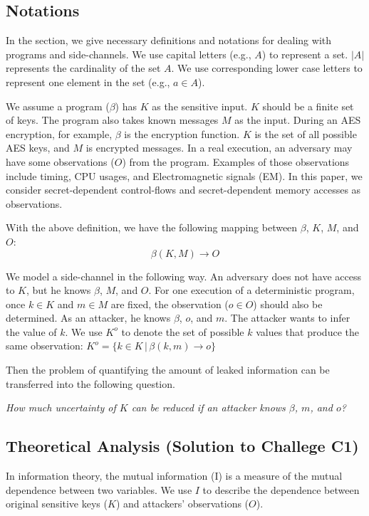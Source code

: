 \subsection{Notations}
In the section, we give necessary definitions and notations for dealing with
programs and side-channels. We use capital letters (e.g., $A$) to represent a
set. $|A|$ represents the cardinality of the set $A$. We use corresponding lower case
letters to represent one element in the set (e.g., $a \in A$).

We assume a program ($\beta$) has $K$ as the sensitive input. $K$ should be 
a finite set of keys. The program also takes known messages $M$ as the input. 
During an AES encryption, for example, 
$\beta$ is the encryption function. $K$ is the set of all possible AES keys, 
and $ M $ is encrypted messages. In a real execution, an adversary may have 
some observations ($O$) from the program. Examples of those observations include 
timing, CPU usages, and Electromagnetic signals (EM). In this paper, 
we consider secret-dependent control-flows and secret-dependent memory 
accesses as observations.

With the above definition, we have the following mapping between $\beta$,
$K$, $M$, and $O$:
\begin{displaymath}
    \beta(K, M) \rightarrow O
\end{displaymath}


We model a side-channel in the following way. An adversary does not have
access to $K$, but he knows $\beta$, $M$, and $O$. For one execution of a
deterministic program, once $k \in K$ and $m \in M$ are fixed, the observation
($o \in O$) should also be determined. As an attacker, he knows $\beta$, $o$,
and $m$. The attacker wants to infer the value of $k$. We use $K^o$ to denote
the set of possible $k$ values that produce the same observation: $K^o = \{ k \in K \, |\, \beta(k, m) \rightarrow o\}$

Then the problem of quantifying the amount of leaked information can be
transferred into the following question.

\emph{How much uncertainty of $K$ can be reduced if an attacker knows $\beta$, $m$, and $o$?}

\subsection{Theoretical Analysis \textbf{(Solution to Challege C1)}}
In information theory, the mutual information (I) is a measure of the mutual
dependence between two variables. We use $I$ to describe the
dependence between original sensitive keys ($K$) and attackers' observations ($O$).

